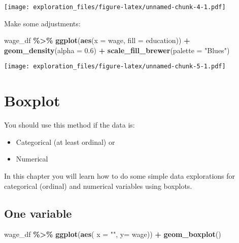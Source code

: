 \documentclass[
]{book}
\newenvironment{Shaded}{\begin{snugshade}}{\end{snugshade}}
\newcommand{\DataTypeTok}[1]{\textcolor[rgb]{0.13,0.29,0.53}{#1}}
\newcommand{\FloatTok}[1]{\textcolor[rgb]{0.00,0.00,0.81}{#1}}
\newcommand{\KeywordTok}[1]{\textcolor[rgb]{0.13,0.29,0.53}{\textbf{#1}}}
\newcommand{\NormalTok}[1]{#1}
\newcommand{\OperatorTok}[1]{\textcolor[rgb]{0.81,0.36,0.00}{\textbf{#1}}}
\newcommand{\StringTok}[1]{\textcolor[rgb]{0.31,0.60,0.02}{#1}}
\providecommand{\tightlist}{%
  \setlength{\itemsep}{0pt}\setlength{\parskip}{0pt}}
\begin{document}
\texttt{[image: exploration\_files/figure-latex/unnamed-chunk-4-1.pdf]}

Make some adjustments:

\begin{Shaded}
\begin{Highlighting}[]
\NormalTok{wage\_df }\OperatorTok{\%\textgreater{}\%}\StringTok{ }
\StringTok{  }\KeywordTok{ggplot}\NormalTok{(}\KeywordTok{aes}\NormalTok{(}\DataTypeTok{x =}\NormalTok{ wage, }\DataTypeTok{fill =}\NormalTok{ education)) }\OperatorTok{+}
\StringTok{  }\KeywordTok{geom\_density}\NormalTok{(}\DataTypeTok{alpha =} \FloatTok{0.6}\NormalTok{) }\OperatorTok{+}
\StringTok{  }\KeywordTok{scale\_fill\_brewer}\NormalTok{(}\DataTypeTok{palette =} \StringTok{"Blues"}\NormalTok{)}
\end{Highlighting}
\end{Shaded}

\texttt{[image: exploration\_files/figure-latex/unnamed-chunk-5-1.pdf]}

\hypertarget{boxplot}{%
\chapter{Boxplot}\label{boxplot}}

You should use this method if the data is:

\begin{itemize}
\tightlist
\item
  Categorical (at least ordinal) or
\item
  Numerical
\end{itemize}

In this chapter you will learn how to do some simple data explorations for categorical (ordinal) and numerical variables using boxplots.

\hypertarget{one-variable-3}{%
\section{One variable}\label{one-variable-3}}

\begin{Shaded}
\begin{Highlighting}[]
\NormalTok{wage\_df }\OperatorTok{\%\textgreater{}\%}\StringTok{ }
\StringTok{  }\KeywordTok{ggplot}\NormalTok{(}\KeywordTok{aes}\NormalTok{( }\DataTypeTok{x =} \StringTok{""}\NormalTok{, }\DataTypeTok{y=}\NormalTok{ wage)) }\OperatorTok{+}\StringTok{ }
\StringTok{  }\KeywordTok{geom\_boxplot}\NormalTok{() }
\end{Highlighting}
\end{Shaded}
\end{document}
